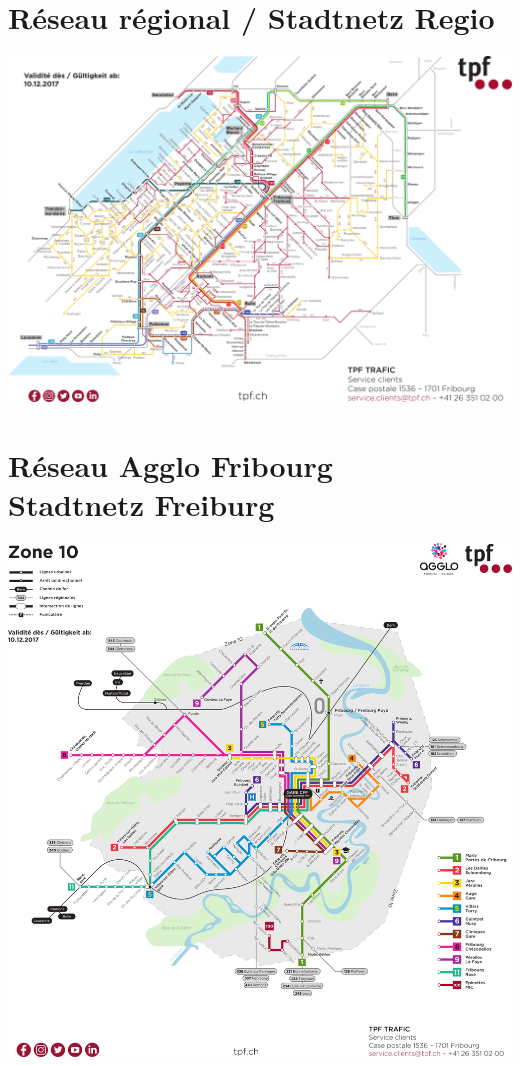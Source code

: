 \section*{Réseau régional / Stadtnetz Regio}
\vspace*{2mm}
\par
\begin{center}
\includegraphics[angle=90,origin=c,width=.9\textwidth]{fig/2018_plan-Global_QMS_Corporate_A3-paysage.png}
\end{center}
\clearpage%
\thispagestyle{empty}%
\section*{Réseau Agglo Fribourg\\Stadtnetz Freiburg}%
\vspace*{15mm}
\par
\begin{center}
\includegraphics[width=\textwidth]{fig/2018_plan-Agglo_QMS_CorporateA3-portrait.png}
\end{center}
